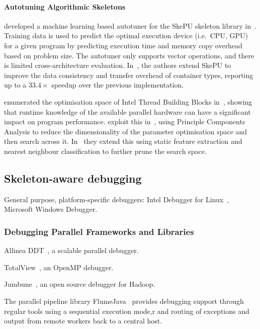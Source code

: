 \paragraph{Autotuning Algorithmic Skeletons}
\citeauthor{Dastgeer2011} developed a machine learning based autotuner
for the SkePU skeleton library in~\cite{Dastgeer2011}. Training data
is used to predict the optimal execution device (i.e.\ CPU, GPU) for a
given program by predicting execution time and memory copy overhead
based on problem size. The autotuner only supports vector operations,
and there is limited cross-architecture
evaluation. In~\cite{Dastgeer2015a}, the authors extend SkePU to
improve the data consistency and transfer overhead of container types,
reporting up to a $33.4\times$ speedup over the previous
implementation.

\citeauthor{Contreras2008} enumerated the optimisation space of Intel
Thread Building Blocks in~\cite{Contreras2008}, showing that runtime
knowledge of the available parallel hardware can have a significant
impact on program performance. \citeauthor{Collins2012} exploit this
in~\cite{Collins2012}, using Principle Components Analysis to reduce
the dimensionality of the parameter optimisation space and then search
across it. In~\cite{Collins2013} they extend this using static feature
extraction and nearest neighbour classification to further prune the
search space.


\subsection{Skeleton-aware debugging}

General purpose, platform-specific debuggers: Intel Debugger for
Linux~\cite{Blair-chappell}, Microsoft Windows Debugger.


\subsubsection{Debugging Parallel Frameworks and Libraries}

Allinea DDT~\cite{K2010}, a scalable parallel debugger.

TotalView~\cite{Cownie2000}, an OpenMP debugger.

Jumbune~\cite{ImpetusTechnologies}, an open source debugger for
Hadoop.

The parallel pipeline library FlumeJava~\cite{Chambers2010} provides
debugging support through regular tools using a sequential execution
mode,r and routing of exceptions and output from remote workers back to
a central host.


